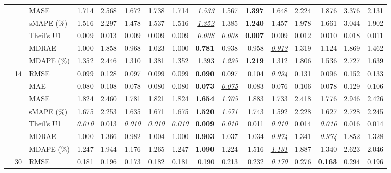 \begin{table}[!htbp]
{\begin{tabular}{lllrrrrrrrrrrrrr}
 &  & MASE & 1.714 & 2.568 & 1.672 & 1.738 & 1.714 & \underline{\textit{1.533}} & 1.567 & \textbf{1.397} & 1.648 & 2.224 & 1.876 & 3.376 & 2.131 \\
 &  & sMAPE (\%) & 1.516 & 2.297 & 1.478 & 1.537 & 1.516 & \underline{\textit{1.352}} & 1.385 & \textbf{1.240} & 1.457 & 1.978 & 1.661 & 3.044 & 1.902 \\
 &  & Theil's U1 & 0.009 & 0.013 & 0.009 & 0.009 & 0.009 & \underline{\textit{0.008}} & \underline{\textit{0.008}} & \textbf{0.007} & 0.009 & 0.012 & 0.010 & 0.018 & 0.011 \\
 &  & MDRAE & 1.000 & 1.858 & 0.968 & 1.023 & 1.000 & \textbf{0.781} & 0.938 & 0.958 & \underline{\textit{0.913}} & 1.319 & 1.124 & 1.869 & 1.462 \\
 &  & MDAPE (\%) & 1.352 & 2.446 & 1.310 & 1.381 & 1.352 & 1.393 & \underline{\textit{1.295}} & \textbf{1.219} & 1.312 & 1.806 & 1.536 & 2.727 & 1.639 \\
\cmidrule(lr){2-16}
 & 14 & RMSE & 0.099 & 0.128 & 0.097 & 0.099 & 0.099 & \textbf{0.090} & 0.097 & 0.104 & \underline{\textit{0.094}} & 0.131 & 0.096 & 0.152 & 0.133 \\
 &  & MAE & 0.080 & 0.108 & 0.078 & 0.080 & 0.080 & \textbf{0.073} & \underline{\textit{0.075}} & 0.083 & 0.076 & 0.106 & 0.078 & 0.129 & 0.106 \\
 &  & MASE & 1.824 & 2.460 & 1.781 & 1.821 & 1.824 & \textbf{1.654} & \underline{\textit{1.705}} & 1.883 & 1.733 & 2.418 & 1.776 & 2.946 & 2.426 \\
 &  & sMAPE (\%) & 1.675 & 2.253 & 1.635 & 1.671 & 1.675 & \textbf{1.520} & \underline{\textit{1.571}} & 1.743 & 1.592 & 2.228 & 1.627 & 2.728 & 2.245 \\
 &  & Theil's U1 & \underline{\textit{0.010}} & 0.013 & \underline{\textit{0.010}} & \underline{\textit{0.010}} & \underline{\textit{0.010}} & \textbf{0.009} & \underline{\textit{0.010}} & 0.011 & \underline{\textit{0.010}} & 0.014 & \underline{\textit{0.010}} & 0.016 & 0.014 \\
 &  & MDRAE & 1.000 & 1.366 & 0.982 & 1.004 & 1.000 & \textbf{0.903} & 1.037 & 1.034 & \underline{\textit{0.974}} & 1.341 & \underline{\textit{0.974}} & 1.852 & 1.328 \\
 &  & MDAPE (\%) & 1.247 & 1.944 & 1.176 & 1.265 & 1.247 & \textbf{1.090} & 1.224 & 1.516 & \underline{\textit{1.131}} & 1.887 & 1.340 & 2.623 & 2.046 \\
\cmidrule(lr){2-16}
 & 30 & RMSE & 0.181 & 0.196 & 0.173 & 0.182 & 0.181 & 0.190 & 0.213 & 0.232 & \underline{\textit{0.170}} & 0.276 & \textbf{0.163} & 0.294 & 0.196 \\

\end{tabular}}
\end{table}
